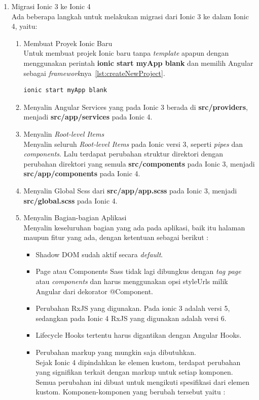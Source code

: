 \begin{enumerate}
\newpage
	\item Migrasi Ionic 3 ke Ionic 4 \\
	Ada beberapa langkah untuk melakukan migrasi dari Ionic 3 ke dalam Ionic 4, yaitu:
	

	\begin{enumerate}
		\item Membuat Proyek Ionic Baru \\
		Untuk membuat projek Ionic baru tanpa {\it template} apapun dengan menggunakan perintah \textbf{ionic start myApp blank} dan memilih Angular sebagai {\it framework}nya~\ref{lst:createNewProject}.
		\begin{lstlisting}[label={lst:createNewProject}, caption=Perintah Membuat Proyek Ionic Baru]
ionic start myApp blank
		\end{lstlisting}

		\item Menyalin Angular Services yang pada Ionic 3 berada di \textbf{src/providers}, menjadi \textbf{src/app/services} pada Ionic 4.

		\item Menyalin {\it Root-level Items} \\
		Menyalin seluruh {\it Root-level Items} pada Ionic versi 3, seperti \textit{pipes} dan \textit{components}. Lalu terdapat perubahan struktur direktori dengan perubahan direktori yang semula \textbf{src/components} pada Ionic 3, menjadi \textbf{src/app/components} pada Ionic 4.

		\item Menyalin Global Scss dari \textbf{src/app/app.scss} pada Ionic 3, menjadi \textbf{src/global.scss} pada Ionic 4.

		\item Menyalin Bagian-bagian Aplikasi \\
		Menyalin keseluruhan bagian yang ada pada aplikasi, baik itu halaman maupun fitur yang ada, dengan ketentuan sebagai berikut :

		\begin{itemize}
			\item Shadow DOM sudah aktif secara {\it default}.
			\item Page atau Components Sass tidak lagi dibungkus dengan \textit{tag page} atau \textit{components} dan harus menggunakan opsi styleUrls milik Angular dari dekorator @Component.
			\item Perubahan RxJS yang digunakan. Pada ionic 3 adalah versi 5, sedangkan pada Ionic 4 RxJS yang digunakan adalah versi 6.
			\item Lifecycle Hooks tertentu harus digantikan dengan Angular Hooks.
			\item Perubahan markup yang mungkin saja dibutuhkan. \\
			Sejak Ionic 4 dipindahkan ke elemen kustom, terdapat perubahan yang signifikan terkait dengan markup untuk setiap komponen. Semua perubahan ini dibuat untuk mengikuti spesifikasi dari elemen kustom. Komponen-komponen yang berubah tersebut yaitu :


\end{itemize}
\end{enumerate}
\end{enumerate}
